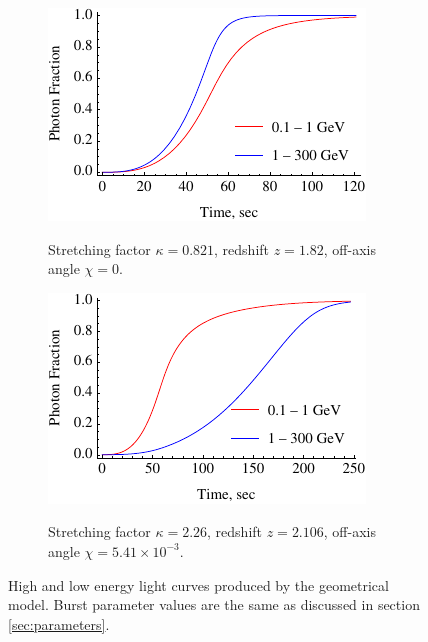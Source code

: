 \documentclass{article}
\begin{document}
	\begin{figure}
		\centering
		\hspace*{\fill}
		\begin{subfigure}{0.45\textwidth}
			\includegraphics[width=\textwidth]{sampleLightCurveLogNegative}
			\label{fig:sampleLightCurveLogNegative}
			\caption{Stretching factor $\kappa = 0.821$, redshift $z = 1.82$, off-axis angle $\chi = 0$.}
		\end{subfigure}
		\hfill
		\begin{subfigure}{0.45\textwidth}
			\includegraphics[width=\textwidth]{sampleLightCurveLogPositive}
			\label{fig:sampleLightCurveLogPosivie}
			\caption{Stretching factor $\kappa = 2.26$, redshift $z = 2.106$, off-axis angle $\chi = 5.41 \times 10^{-3}$.}
		\end{subfigure}
		\hspace*{\fill}
		\caption{
			High and low energy light curves produced by the geometrical model.
			Burst parameter values are the same as discussed in section \ref{sec:parameters}.
		}
		\label{fig:sampleLightCurves}
	\end{figure}
\end{document}
